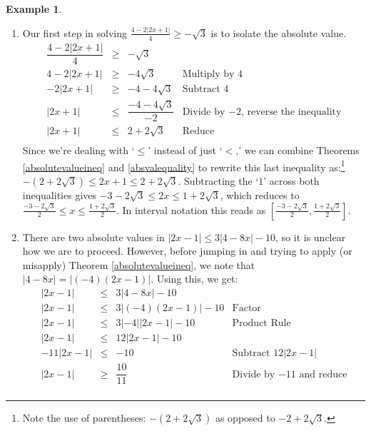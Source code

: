 \documentclass[11pt]{article}
\theoremstyle{definition}  %
\newtheorem{ex}{\bf Example}
\begin{document}
\begin{ex}
\begin{enumerate}
\item  Our first step in solving $\frac{4 - 2|2x+1|}{4} \geq -\sqrt{3}$ is to isolate the absolute value. \[ \begin{array}{rclr}
\dfrac{4 - 2|2x+1|}{4} & \geq & -\sqrt{3} & \\ [5pt]

4 - 2|2x+1| & \geq & -4\sqrt{3} & \text{Multiply by $4$} \\
- 2|2x+1| & \geq & -4-4\sqrt{3} & \text{Subtract $4$} \\
|2x+1| & \leq & \dfrac{-4-4\sqrt{3}}{-2} & \text{Divide by $-2$,  reverse the inequality} \\ [8pt]
|2x+1| & \leq & 2 + 2\sqrt{3} & \text{Reduce} \\ 

\end{array}\] Since we're dealing with `$\leq$' instead of just `$<$,' we can combine Theorems \ref{absolutevalueineq} and  \ref{absvalequality} to rewrite this last inequality as:\footnote{Note the use of parentheses: $-(2+2\sqrt{3})$ as opposed to $-2 + 2\sqrt{3}$.}   $-(2 + 2\sqrt{3}) \leq 2x+1 \leq 2+2\sqrt{3}$. Subtracting the `$1$' across both inequalities gives $-3-2\sqrt{3} \leq 2x \leq 1 + 2\sqrt{3}$, which reduces to $\frac{-3-2\sqrt{3}}{2} \leq x \leq \frac{1+2\sqrt{3}}{2}$.  In interval notation this reads as  $\left[\frac{-3-2\sqrt{3}}{2}, \frac{1+2\sqrt{3}}{2}\right]$.

\item  There are two absolute values in $|2x - 1| \leq 3|4 - 8x| - 10$, so it is unclear how we are to proceed.  However, before jumping in and trying to apply (or misapply) Theorem \ref{absolutevalueineq}, we note that $|4 - 8x| = |(-4)(2x-1)|$.   Using this, we get:\[ \begin{array}{rclr}

|2x - 1| & \leq & 3|4 - 8x| - 10 & \\

|2x - 1| & \leq & 3|(-4)(2x-1)| - 10 & \text{Factor}\\

|2x - 1| & \leq & 3|-4||2x-1| - 10 & \text{Product Rule}\\

|2x - 1| & \leq & 12|2x-1| - 10 & \\

-11|2x - 1| & \leq & - 10 & \text{Subtract $12|2x-1|$} \\

|2x - 1| & \geq  & \dfrac{10}{11} & \text{Divide by $-11$ and reduce} \\


\end{array}\]
\end{enumerate}
\end{ex}
\end{document}

